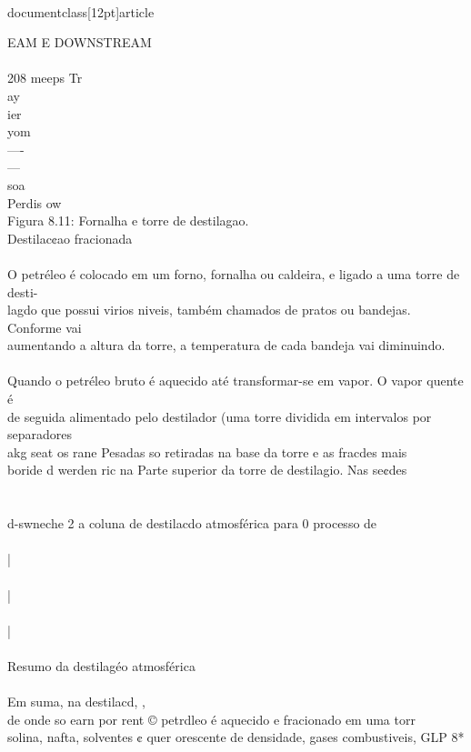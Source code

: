 \\documentclass[12pt]{article}
\begin{document}
{EAM E DOWNSTREAM\\
\\
208 meeps Tr\\
ay\\
ier\\
yom\\
—-\\
—\\
soa\\
Perdis ow\\
Figura 8.11: Fornalha e torre de destilagao.\\
Destilac¢ao fracionada\\
\\
O petréleo é colocado em um forno, fornalha ou caldeira, e ligado a uma torre de desti-\\
lagdo que possui virios niveis, também chamados de pratos ou bandejas. Conforme vai\\
aumentando a altura da torre, a temperatura de cada bandeja vai diminuindo.\\
\\
Quando o petréleo bruto é aquecido até transformar-se em vapor. O vapor quente é\\
de seguida alimentado pelo destilador (uma torre dividida em intervalos por separadores\\
akg seat os rane Pesadas so retiradas na base da torre e as fracdes mais\\
boride d werden ric na Parte superior da torre de destilagio. Nas se¢des\\
\\%
\\
d-swneche 2 a coluna de destilacdo atmosférica para 0 processo de\\
\\
|\\
\\
|\\
\\
|\\
\\
Resumo da destilagéo atmosférica\\
\\
Em suma, na destilacd, ,\\
de onde so earn por rent © petrdleo é aquecido e fracionado em uma torr\\
solina, nafta, solventes ¢ quer orescente de densidade, gases combustiveis, GLP 8*\\
}
\end{document}
